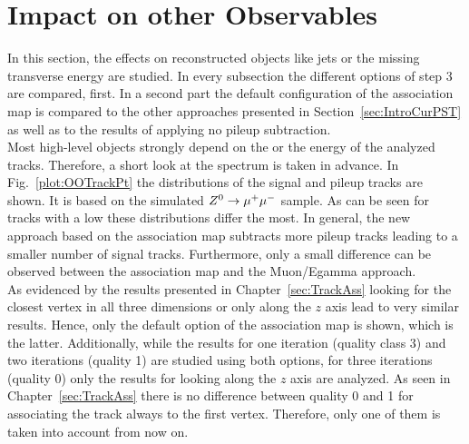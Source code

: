\chapter{Impact on other Observables \label{sec:OO}}

In this section, the effects on reconstructed objects like jets or the missing transverse energy are studied. In every subsection the different options of step 3 are compared, first. In a second part the default configuration of the association map is compared to the other approaches presented in Section~\ref{sec:IntroCurPST} as well as to the results of applying no pileup subtraction. \\
Most high-level objects strongly depend on the \pt or the energy of the analyzed tracks. Therefore, a short look at the \pt spectrum is taken in advance. In Fig.~\ref{plot:OOTrackPt} the \pt distributions of the signal and pileup tracks are shown. It is based on the simulated ${Z^{0}}\rightarrow\mu^+\mu^-$ sample. As can be seen for tracks with a low \pt these distributions differ the most. In general, the new approach based on the association map subtracts more pileup tracks leading to a smaller number of signal tracks. Furthermore, only a small difference can be observed between the association map and the Muon/Egamma approach.  \\
As evidenced by the results presented in Chapter~\ref{sec:TrackAss} looking for the closest vertex in all three dimensions or only along the $z$ axis lead to very similar results. Hence, only the default option of the association map is shown, which is the latter. Additionally, while the results for one iteration (quality class 3) and two iterations (quality 1) are studied using both options, for three iterations (quality 0) only the results for looking along the $z$ axis are analyzed. As seen in Chapter~\ref{sec:TrackAss} there is no difference between quality 0 and 1 for associating the track always to the first vertex. Therefore, only one of them is taken into account from now on.

